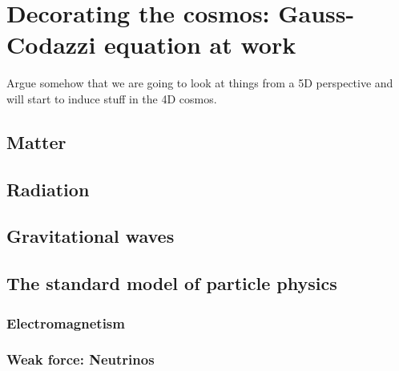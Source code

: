 \section{Decorating the cosmos: Gauss-Codazzi equation at work}\label{sec: decoration}
Argue somehow that we are going to look at things from a 5D perspective and will start to induce stuff in the 4D cosmos.
\subsection{Matter}
\subsection{Radiation}
\subsection{Gravitational waves}
\subsection{The standard model of particle physics}
\subsubsection{Electromagnetism}
\subsubsection{Weak force: Neutrinos}